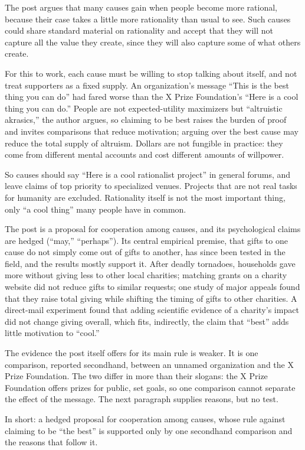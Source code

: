 \begin{afterword}
\summaryhead

The post argues that many causes gain when people become more rational, because their case takes a little more rationality than usual to see. Such causes could share standard material on rationality and accept that they will not capture all the value they create, since they will also capture some of what others create.

For this to work, each cause must be willing to stop talking about itself, and not treat supporters as a fixed supply. An organization's message ``This is the best thing you can do'' had fared worse than the X Prize Foundation's ``Here is a cool thing you can do.'' People are not expected-utility maximizers but ``altruistic akrasics,'' the author argues, so claiming to be best raises the burden of proof and invites comparisons that reduce motivation; arguing over the best cause may reduce the total supply of altruism. Dollars are not fungible in practice: they come from different mental accounts and cost different amounts of willpower.

So causes should say ``Here is a cool rationalist project'' in general forums, and leave claims of top priority to specialized venues. Projects that are not real tasks for humanity are excluded. Rationality itself is not the most important thing, only ``a cool thing'' many people have in common.

\responsehead

The post is a proposal for cooperation among causes, and its psychological claims are hedged (``may,'' ``perhaps''). Its central empirical premise, that gifts to one cause do not simply come out of gifts to another, has since been tested in the field, and the results mostly support it. After deadly tornadoes, households gave more without giving less to other local charities; matching grants on a charity website did not reduce gifts to similar requests; one study of major appeals found that they raise total giving while shifting the timing of gifts to other charities. A direct-mail experiment found that adding scientific evidence of a charity's impact did not change giving overall, which fits, indirectly, the claim that ``best'' adds little motivation to ``cool.''

The evidence the post itself offers for its main rule is weaker. It is one comparison, reported secondhand, between an unnamed organization and the X Prize Foundation. The two differ in more than their slogans: the X Prize Foundation offers prizes for public, set goals, so one comparison cannot separate the effect of the message. The next paragraph supplies reasons, but no test.

In short: a hedged proposal for cooperation among causes, whose rule against claiming to be ``the best'' is supported only by one secondhand comparison and the reasons that follow it.
\end{afterword}
